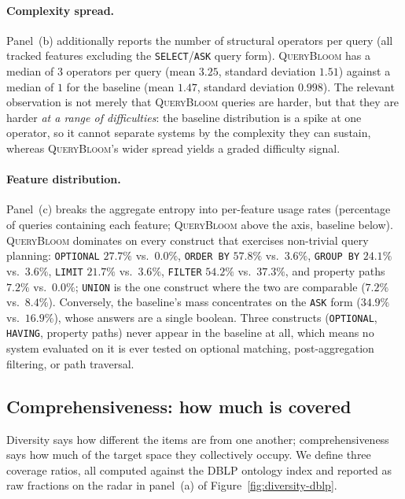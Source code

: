 \paragraph{Complexity spread.} Panel~(b) additionally reports the number of structural
operators per query (all tracked features excluding the \texttt{SELECT}/\texttt{ASK} query
form). \textsc{QueryBloom} has a median of $3$ operators per query (mean $3.25$, standard
deviation $1.51$) against a median of $1$ for the baseline (mean $1.47$, standard deviation
$0.998$). The relevant observation is not merely that \textsc{QueryBloom} queries are
harder, but that they are harder \emph{at a range of difficulties}: the baseline
distribution is a spike at one operator, so it cannot separate systems by the complexity
they can sustain, whereas \textsc{QueryBloom}'s wider spread yields a graded difficulty
signal.

\paragraph{Feature distribution.} Panel~(c) breaks the aggregate entropy into per-feature
usage rates (percentage of queries containing each feature; \textsc{QueryBloom} above the
axis, baseline below). \textsc{QueryBloom} dominates on every construct that exercises
non-trivial query planning: \texttt{OPTIONAL} $27.7\%$ vs.\ $0.0\%$, \texttt{ORDER BY}
$57.8\%$ vs.\ $3.6\%$, \texttt{GROUP BY} $24.1\%$ vs.\ $3.6\%$, \texttt{LIMIT} $21.7\%$
vs.\ $3.6\%$, \texttt{FILTER} $54.2\%$ vs.\ $37.3\%$, and property paths $7.2\%$ vs.\
$0.0\%$; \texttt{UNION} is the one construct where the two are comparable ($7.2\%$ vs.\
$8.4\%$). Conversely, the baseline's mass concentrates on the \texttt{ASK} form
($34.9\%$ vs.\ $16.9\%$), whose answers are a single boolean. Three constructs
(\texttt{OPTIONAL}, \texttt{HAVING}, property paths) never appear in the baseline at all,
which means no system evaluated on it is ever tested on optional matching, post-aggregation
filtering, or path traversal.

\subsection{Comprehensiveness: how much is covered}

Diversity says how different the items are from one another; comprehensiveness says how much
of the target space they collectively occupy. We define three coverage ratios, all computed
against the DBLP ontology index and reported as raw fractions on the radar in
panel~(a) of Figure~\ref{fig:diversity-dblp}.

